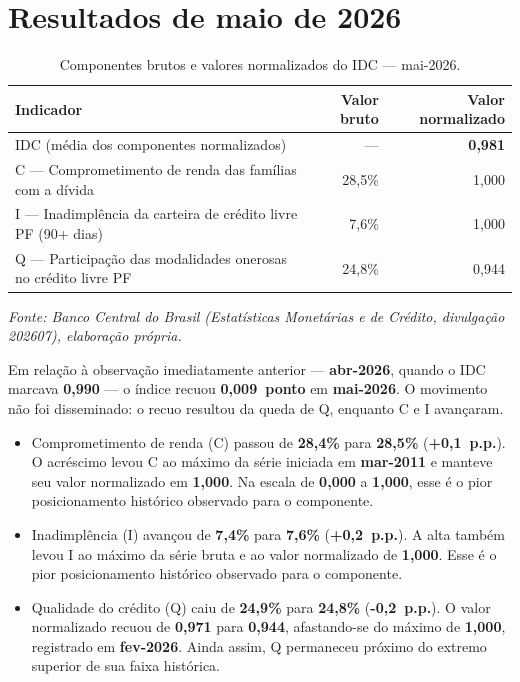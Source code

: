 \documentclass[11pt,a4paper]{article}
\newcommand{\fonte}[1]{%
  \par\vspace{0.2\baselineskip}%
  \small\textit{Fonte: #1}\par\vspace{0.8\baselineskip}%
}
\newcommand{\mesreferencia}{maio de 2026}
\newcommand{\mesref}{mai-2026}
\newcommand{\mesanterior}{abr-2026}
\newcommand{\competencia}{202607}
\begin{document}
\section{Resultados de \mesreferencia}

\begin{table}[htbp]
  \centering
  \caption{Componentes brutos e valores normalizados do IDC --- \mesref.}
  \label{tab:componentes}
  \begin{tabular}{p{8.0cm}rr}
    \toprule
    Indicador & Valor bruto & Valor normalizado \\
    \midrule
    IDC (média dos componentes normalizados)
      & ---
      & \textbf{0,981} \\
    C --- Comprometimento de renda das famílias com a dívida
      & 28,5\%
      & 1,000 \\
    I --- Inadimplência da carteira de crédito livre PF (90+ dias)
      & 7,6\%
      & 1,000 \\
    Q --- Participação das modalidades onerosas no crédito livre PF
      & 24,8\%
      & 0,944 \\
    \bottomrule
  \end{tabular}
\end{table}

\fonte{Banco Central do Brasil (Estatísticas Monetárias e de Crédito,
divulgação \competencia), elaboração própria.}

Em relação à observação imediatamente anterior --- \textbf{\mesanterior}, quando o IDC
marcava \textbf{0,990} --- o índice recuou
\textbf{0,009~ponto} em \textbf{\mesref}.
O movimento não foi disseminado: o recuo resultou da queda de Q, enquanto C e I avançaram.

\begin{itemize}
  \item Comprometimento de renda (C) passou de \textbf{28,4\%} para
    \textbf{28,5\%} (\textbf{+0,1~p.p.}).
    O acréscimo levou C ao máximo da série iniciada em \textbf{mar-2011} e manteve
    seu valor normalizado em \textbf{1,000}. Na escala de \textbf{0,000} a
    \textbf{1,000}, esse é o pior posicionamento histórico observado para o componente.

  \item Inadimplência (I) avançou de
    \textbf{7,4\%} para \textbf{7,6\%}
    (\textbf{+0,2~p.p.}).
    A alta também levou I ao máximo da série bruta e ao valor normalizado de
    \textbf{1,000}. Esse é o pior posicionamento histórico observado para o componente.

  \item Qualidade do crédito (Q) caiu de
    \textbf{24,9\%} para \textbf{24,8\%}
    (\textbf{-0,2~p.p.}).
    O valor normalizado recuou de \textbf{0,971} para \textbf{0,944}, afastando-se
    do máximo de \textbf{1,000}, registrado em \textbf{fev-2026}. Ainda assim, Q
    permaneceu próximo do extremo superior de sua faixa histórica.
\end{itemize}
\end{document}
